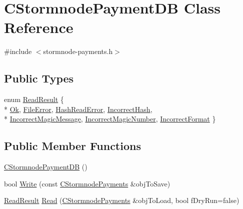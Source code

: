 \hypertarget{class_c_stormnode_payment_d_b}{}\section{C\+Stormnode\+Payment\+D\+B Class Reference}
\label{class_c_stormnode_payment_d_b}


{\ttfamily \#include $<$stormnode-\/payments.\+h$>$}

\subsection*{Public Types}
\begin{DoxyCompactItemize}
\item 
enum \hyperlink{class_c_stormnode_payment_d_b_a2f73dffc05c6751f0c323af60245ea23}{Read\+Result} \{ \\*
\hyperlink{class_c_stormnode_payment_d_b_a2f73dffc05c6751f0c323af60245ea23a2f12de8ca0f127551efaccbdeb5ca6fe}{Ok}, 
\hyperlink{class_c_stormnode_payment_d_b_a2f73dffc05c6751f0c323af60245ea23a7f12ef3395c370257e8fa09d3ff5626e}{File\+Error}, 
\hyperlink{class_c_stormnode_payment_d_b_a2f73dffc05c6751f0c323af60245ea23ac0cd503f26f245397d1a127b93096d4d}{Hash\+Read\+Error}, 
\hyperlink{class_c_stormnode_payment_d_b_a2f73dffc05c6751f0c323af60245ea23ad2964ec8796042a9176c9b729816831e}{Incorrect\+Hash}, 
\\*
\hyperlink{class_c_stormnode_payment_d_b_a2f73dffc05c6751f0c323af60245ea23aa65ede767f1011cf5344c3f3017b6c29}{Incorrect\+Magic\+Message}, 
\hyperlink{class_c_stormnode_payment_d_b_a2f73dffc05c6751f0c323af60245ea23a92265e270412a07493ca64394d575532}{Incorrect\+Magic\+Number}, 
\hyperlink{class_c_stormnode_payment_d_b_a2f73dffc05c6751f0c323af60245ea23a96d00baa28f120ca64ffa93880171c09}{Incorrect\+Format}
 \}
\end{DoxyCompactItemize}
\subsection*{Public Member Functions}
\begin{DoxyCompactItemize}
\item 
\hyperlink{class_c_stormnode_payment_d_b_ade4ae1d8cfaa218535e5abc8174729dd}{C\+Stormnode\+Payment\+D\+B} ()
\item 
bool \hyperlink{class_c_stormnode_payment_d_b_a6dc05426079d7bcf41f2587899e422fd}{Write} (const \hyperlink{class_c_stormnode_payments}{C\+Stormnode\+Payments} \&obj\+To\+Save)
\item 
\hyperlink{class_c_stormnode_payment_d_b_a2f73dffc05c6751f0c323af60245ea23}{Read\+Result} \hyperlink{class_c_stormnode_payment_d_b_abc463c60002bbf00b542952bb3b5cff9}{Read} (\hyperlink{class_c_stormnode_payments}{C\+Stormnode\+Payments} \&obj\+To\+Load, bool f\+Dry\+Run=false)
\end{DoxyCompactItemize}


